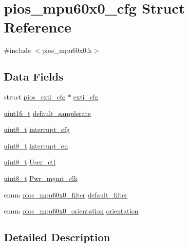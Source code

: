 \hypertarget{structpios__mpu60x0__cfg}{\section{pios\-\_\-mpu60x0\-\_\-cfg Struct Reference}
\label{structpios__mpu60x0__cfg}
}


{\ttfamily \#include $<$pios\-\_\-mpu60x0.\-h$>$}

\subsection*{Data Fields}
\begin{DoxyCompactItemize}
\item 
struct \hyperlink{structpios__exti__cfg}{pios\-\_\-exti\-\_\-cfg} $\ast$ \hyperlink{structpios__mpu60x0__cfg_a3060efb7fe61ef6816d0c76c464bd3f9}{exti\-\_\-cfg}
\item 
\hyperlink{stdint_8h_a273cf69d639a59973b6019625df33e30}{uint16\-\_\-t} \hyperlink{structpios__mpu60x0__cfg_af4581a0013e107281a5ebefa0745d6ff}{default\-\_\-samplerate}
\item 
\hyperlink{stdint_8h_aba7bc1797add20fe3efdf37ced1182c5}{uint8\-\_\-t} \hyperlink{structpios__mpu60x0__cfg_aeadd184c43fe44f818bba2b94d80e099}{interrupt\-\_\-cfg}
\item 
\hyperlink{stdint_8h_aba7bc1797add20fe3efdf37ced1182c5}{uint8\-\_\-t} \hyperlink{structpios__mpu60x0__cfg_a34f330d80ad1406663dbe14f1ae362cd}{interrupt\-\_\-en}
\item 
\hyperlink{stdint_8h_aba7bc1797add20fe3efdf37ced1182c5}{uint8\-\_\-t} \hyperlink{structpios__mpu60x0__cfg_a2fd36500bdaf115a26e2ce8937441a17}{User\-\_\-ctl}
\item 
\hyperlink{stdint_8h_aba7bc1797add20fe3efdf37ced1182c5}{uint8\-\_\-t} \hyperlink{structpios__mpu60x0__cfg_ad4ef97a93c0b2cfc7e71652b2ec8c546}{Pwr\-\_\-mgmt\-\_\-clk}
\item 
enum \hyperlink{group___p_i_o_s___m_p_u60_x0_gacce1988bc994f5ade6ac748c2bf0b924}{pios\-\_\-mpu60x0\-\_\-filter} \hyperlink{structpios__mpu60x0__cfg_a50a6612b9fff2bd96908996d7d734ef3}{default\-\_\-filter}
\item 
enum \hyperlink{group___p_i_o_s___m_p_u60_x0_ga0b97f6902b1564a6eedf92c8937a2a67}{pios\-\_\-mpu60x0\-\_\-orientation} \hyperlink{structpios__mpu60x0__cfg_a43ab1b1e72abc2f1fcf722afefa92dc1}{orientation}
\end{DoxyCompactItemize}


\subsection{Detailed Description}


